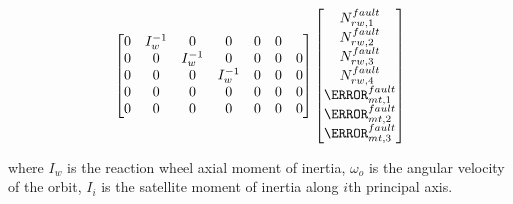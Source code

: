 \begin{align}
\begin{bmatrix}
 0 & I_w^{-1} & 0 & 0 & 0 & 0 \\ 
 0 & 0 & I_w^{-1} & 0& 0 & 0 & 0 \\  
 0 & 0 & 0 & I_w^{-1} & 0 & 0 & 0 \\
 0 & 0 & 0 & 0 & 0 & 0& 0 \\
 0 & 0 & 0 & 0 & 0& 0 & 0 \\
 \end{bmatrix}
 \begin{bmatrix}
 N^{fault}_{rw,1} \\
 N^{fault}_{rw,2} \\
 N^{fault}_{rw,3}\\
 N^{fault}_{rw,4}\\
 \m^{fault}_{mt,1} \\
 \m^{fault}_{mt,2} \\
 \m^{fault}_{mt,3} 
 \end{bmatrix}
\label{eq:uioMatrices}
\end{align}
\normalsize

where $I_w$ is the reaction wheel axial moment of inertia, $\omega_o$ is the angular velocity of the orbit, $I_i$ is the satellite moment of inertia along $i$th principal axis.



